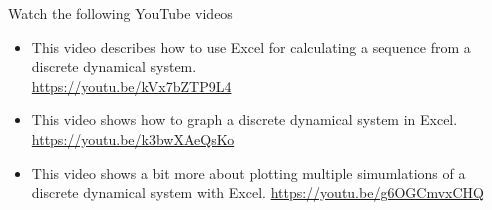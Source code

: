 \begin{problem}
Watch the following YouTube videos 
    \begin{itemize}
        \item This video describes how to use Excel for calculating a sequence
            from a discrete dynamical system. \\
            \href{https://youtu.be/kVx7bZTP9L4}{https://youtu.be/kVx7bZTP9L4}
        \item This video shows how to graph a discrete dynamical system in
            Excel. \\
            \href{https://youtu.be/k3bwXAeQsKo}{https://youtu.be/k3bwXAeQsKo}
        \item This video shows a bit more about plotting multiple simumlations of a
            discrete dynamical system with Excel.
            \href{https://youtu.be/g6OGCmvxCHQ}{https://youtu.be/g6OGCmvxCHQ}
    \end{itemize}
\end{problem}

